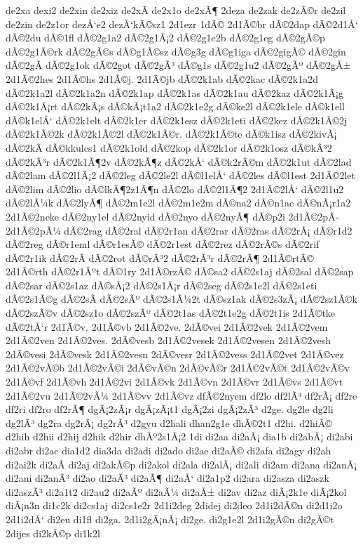 {de2xa
dexi2
de2xin
de2xiz
de2xÃ­
de2x1o
de2xÃ¶
2deza
de2zak
de2zÃ©r
de2zil
de2zin
de2z1or
dezÅ‘e2
dezÅ‘kÃ©sz1
2d1ezr
1dÃ©
2d1Ã©br
dÃ©2dap
dÃ©2d1Å‘
dÃ©2du
dÃ©1fl
dÃ©2g1a2
dÃ©2g1Ã¡2
dÃ©2g1e2b
dÃ©2g1eg
dÃ©2gÃ©p
dÃ©2g1Ã©rk
dÃ©2gÃ©s
dÃ©g1Ã©sz
dÃ©g3g
dÃ©g1iga
dÃ©2gigÃ©
dÃ©2gin
dÃ©2gÃ­
dÃ©2g1ok
dÃ©2got
dÃ©2gÃ³
dÃ©g1s
dÃ©2g1u2
dÃ©2gÃº
dÃ©2gÅ±
2d1Ã©2hes
2d1Ã©hs
2d1Ã©j.
2d1Ã©jb
dÃ©2k1ab
dÃ©2kac
dÃ©2k1a2d
dÃ©2k1a2l
dÃ©2k1a2n
dÃ©2k1ap
dÃ©2k1as
dÃ©2k1au
dÃ©2kaz
dÃ©2k1Ã¡g
dÃ©2k1Ã¡rt
dÃ©2kÃ¡s
dÃ©kÃ¡t1a2
dÃ©2k1e2g
dÃ©ke2l
dÃ©2k1ele
dÃ©k1ell
dÃ©k1elÅ‘
dÃ©2k1elt
dÃ©2k1er
dÃ©2k1esz
dÃ©2k1eti
dÃ©2kez
dÃ©2k1Ã©2j
dÃ©2k1Ã©2k
dÃ©2k1Ã©2l
dÃ©2k1Ã©r.
dÃ©2k1Ã©te
dÃ©k1isz
dÃ©2kivÃ¡
dÃ©2kÃ­
dÃ©kkulcs1
dÃ©2k1old
dÃ©2kop
dÃ©2k1or
dÃ©2k1osz
dÃ©kÃ³2
dÃ©2kÃ³r
dÃ©2k1Ã¶2v
dÃ©2kÃ¶z
dÃ©2kÅ‘
dÃ©k2rÃ©m
dÃ©2k1ut
dÃ©2lad
dÃ©2lam
dÃ©2l1Ã¡2
dÃ©2leg
dÃ©2le2l
dÃ©l1elÅ‘
dÃ©2les
dÃ©l1est
2d1Ã©2let
dÃ©2lim
dÃ©2lio
dÃ©lkÃ¶2z1Ã¶n
dÃ©2lo
dÃ©2l1Ã¶2
2d1Ã©2lÅ‘
dÃ©2l1u2
dÃ©2lÃ¼k
dÃ©2lyÃ¶
dÃ©2m1e2l
dÃ©2m1e2m
dÃ©na2
dÃ©n1ac
dÃ©nÃ¡r1a2
2d1Ã©2neke
dÃ©2ny1el
dÃ©2nyid
dÃ©2nyo
dÃ©2nyÃ¶
dÃ©p2i
2d1Ã©2pÃ­
2d1Ã©2pÃ¼
dÃ©2rag
dÃ©2ral
dÃ©2r1an
dÃ©2rar
dÃ©2ras
dÃ©2rÃ¡
dÃ©r1d2
dÃ©2reg
dÃ©r1eml
dÃ©r1esÃ©
dÃ©2r1est
dÃ©2rez
dÃ©2rÃ©s
dÃ©2rif
dÃ©2r1ik
dÃ©2rÃ­
dÃ©2rot
dÃ©rÃ³2
dÃ©2rÃ³r
dÃ©2rÃ¶
2d1Ã©rtÃ©
2d1Ã©rth
dÃ©2r1Ãºt
dÃ©1ry
2d1Ã©rzÃ©
dÃ©sa2
dÃ©2s1aj
dÃ©2sal
dÃ©2sap
dÃ©2sar
dÃ©2s1az
dÃ©sÃ¡2
dÃ©2s1Ã¡r
dÃ©2seg
dÃ©2s1e2l
dÃ©2s1eti
dÃ©2s1Ã©g
dÃ©2sÃ­
dÃ©2sÃº
dÃ©2s1Ã¼2t
dÃ©sz1ak
dÃ©2s3zÃ¡
dÃ©2sz1Ã©k
dÃ©2szÃ©v
dÃ©2sz1o
dÃ©2szÃº
dÃ©2t1as
dÃ©2t1e2g
dÃ©2t1is
2d1Ã©tke
dÃ©2tÅ‘r
2d1Ã©v.
2d1Ã©vb
2d1Ã©2ve.
2dÃ©vei
2d1Ã©2vek
2d1Ã©2vem
2d1Ã©2ven
2d1Ã©2ves.
2dÃ©vesb
2d1Ã©2vesek
2d1Ã©2vesen
2d1Ã©2vesh
2dÃ©vesi
2dÃ©vesk
2d1Ã©2vesn
2dÃ©vesr
2d1Ã©2vess
2d1Ã©2vet
2d1Ã©vez
2d1Ã©2vÃ©b
2d1Ã©2vÃ©i
2dÃ©vÃ©n
2dÃ©vÃ©r
2d1Ã©2vÃ©t
2d1Ã©2vÃ©v
2d1Ã©vf
2d1Ã©vh
2d1Ã©2vi
2d1Ã©vk
2d1Ã©vn
2d1Ã©vr
2d1Ã©vs
2d1Ã©vt
2d1Ã©2vu
2d1Ã©2vÃ¼
2d1Ã©vv
2d1Ã©vz
dfÃ©2nyem
df2lo
df2lÃ³
df2rÃ¡
df2re
df2ri
df2ro
df2rÃ¶
dgÃ¡2zÃ¡r
dgÃ¡zÃ¡t1
dgÃ¡2zi
dgÃ¡2zÃ³
d2ge.
dg2le
dg2li
dg2lÃ³
dg2ra
dg2rÃ¡
dg2rÃ³
d2gyu
d2hali
dhan2g1e
dhÃ©2t1
d2hi.
d2hiÃ©
d2hih
d2hii
d2hij
d2hik
d2hir
dhÃº2s1Ã¡2
1di
di2aa
di2aÃ¡
dia1b
di2abÃ¡
di2abi
di2abr
di2ac
dia1d2
dia3da
di2adi
di2ado
di2ae
di2aÃ©
di2afa
di2agy
di2ah
di2ai2k
di2aÃ­
di2aj
di2akÃ©p
di2akol
di2ala
di2alÃ¡
di2ali
di2am
di2ana
di2anÃ¡
di2ani
di2anÃ³
di2ao
di2aÃ³
di2aÃ¶
di2aÅ‘
di2a1p2
di2ara
di2asza
di2aszk
di2aszÃ³
di2a1t2
di2au2
di2aÃº
di2aÃ¼
di2aÅ±
di2av
di2az
diÃ¡2k1e
diÃ¡2kol
diÃ¡n3n
di1c2k
di2cs1aj
di2cs1e2r
2d1i2deg
2didej
di2deo
2d1i2dÃ©n
di2d1i2o
2d1i2dÅ‘
di2eu
di1fl
di2ga.
2d1i2gÃ¡nÃ¡
di2ge.
di2g1e2l
2d1i2gÃ©n
di2gÃ©t
2dijes
di2kÃ©p
di1k2l
}
